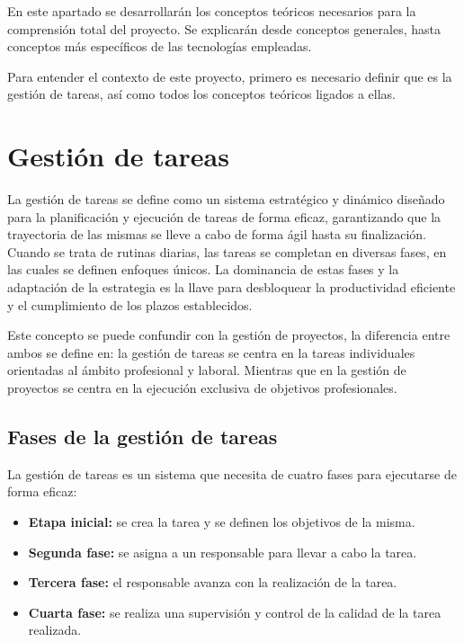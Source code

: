 
En este apartado se desarrollarán los conceptos teóricos necesarios para la comprensión total del proyecto. Se explicarán desde conceptos generales, hasta conceptos más específicos de las tecnologías empleadas.

Para entender el contexto de este proyecto, primero es necesario definir que es la gestión de tareas, así como todos los conceptos teóricos ligados a ellas.

\section{Gestión de tareas}
La gestión de tareas se define como un sistema estratégico y dinámico diseñado para la planificación y ejecución de tareas de forma eficaz, garantizando que la trayectoria de las mismas se lleve a cabo de forma ágil hasta su finalización. Cuando se trata de rutinas diarias, las tareas se completan en diversas fases, en las cuales se definen enfoques únicos. La dominancia de estas fases y la adaptación de la estrategia es la llave para desbloquear la productividad eficiente y el cumplimiento de los plazos establecidos.

Este concepto se puede confundir con la gestión de proyectos, la diferencia entre ambos se define en: la gestión de tareas se centra en la tareas individuales orientadas al ámbito profesional y laboral. Mientras que en la gestión de proyectos se centra en la ejecución exclusiva de objetivos profesionales. 
\subsection{Fases de la gestión de tareas}
La gestión de tareas es un sistema que necesita de cuatro fases para ejecutarse de forma eficaz:

\begin{itemize}
    \item \textbf{Etapa inicial:} se crea la tarea y se definen los objetivos de la misma.
    \item \textbf{Segunda fase:} se asigna a un responsable para llevar a cabo la tarea.
    \item \textbf{Tercera fase:} el responsable avanza con la realización de la tarea.
    \item \textbf{Cuarta fase:} se realiza una supervisión y control de la calidad de la tarea realizada.
\end{itemize}

